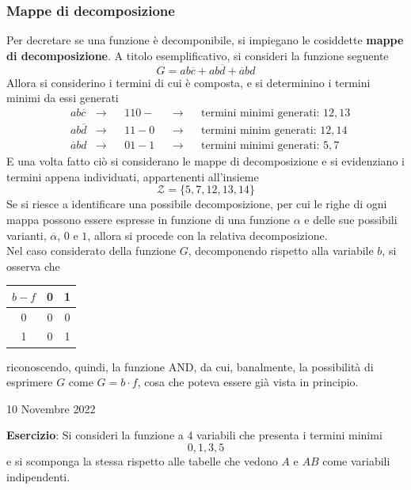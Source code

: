 \documentclass[a4paper]{extarticle}
\renewcommand\arraystretch{}
\begin{document}
\vspace{1em}
\noindent
\subsubsection{Mappe di decomposizione}
Per decretare se una funzione è decomponibile, si impiegano le cosiddette \textbf{mappe di decomposizione}. A titolo esemplificativo, si consideri la funzione seguente
\[G=ab\overline{c}+ab\overline{d}+\overline{a}bd\]
Allora si considerino i termini di cui è composta, e si determinino i termini minimi da essi generati
\begin{align*}
    &ab\overline{c} &\rightarrow&&110- &&\rightarrow&&\text{termini minimi generati: } 12,13\\
    &ab\overline{d} &\rightarrow&&11-0 &&\rightarrow&&\text{termini minim generati: } 12,14\\
    &\overline{a}bd &\rightarrow&&01-1 &&\rightarrow&&\text{termini minimi generati: } 5,7
\end{align*}
E una volta fatto ciò si considerano le mappe di decomposizione e si evidenziano i termini appena individuati, appartenenti all'insieme
\[\mathcal{Z}=\{5,7,12,13,14\}\]
Se si riesce a identificare una possibile decomposizione, per cui le righe di ogni mappa possono essere espresse in funzione di una funzione $\alpha$ e delle sue possibili varianti, $\overline{\alpha}$, $0$ e $1$, allora si procede con la relativa decomposizione.\\
Nel caso considerato della funzione $G$, decomponendo rispetto alla variabile $b$, si osserva che

\vspace{1em}
\noindent
\begin{table}[H]
\setlength{\tabcolsep}{4pt}
\renewcommand{\arraystretch}{1.2}
\centering
\begin{tabular}{|c|c|c|}
    \hline
    $b-f$ & 0 & 1\\
    \hline
    0     & 0 & 0\\
    \hline
    1     & 0 & 1\\
    \hline
\end{tabular}
\end{table}

\vspace{1em}
\noindent
riconoscendo, quindi, la funzione AND, da cui, banalmente, la possibilità di esprimere $G$ come $G=b \cdot f$, cosa che poteva essere già vista in principio.

\newpage
\begin{center}
    10 Novembre 2022
\end{center}
\noindent
\textbf{Esercizio}: Si consideri la funzione a $4$ variabili che presenta i termini minimi
\[0,1,3,5\]
e si scomponga la stessa rispetto alle tabelle che vedono $A$ e $AB$ come variabili indipendenti.\\
\end{document}
